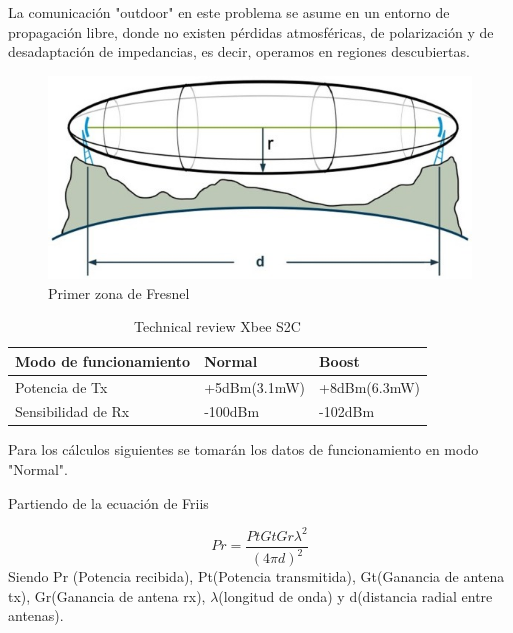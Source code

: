 \documentclass[11pt,oneside,spanish,a4paper]{article}
\begin{document}
La comunicaci\'on "outdoor" en este problema se asume en un entorno de propagaci\'on libre, donde no existen p\'erdidas atmosf\'ericas, de polarizaci\'on y de desadaptaci\'on de impedancias, es decir, operamos en regiones descubiertas. 

\begin{figure}[h]
	\centering\includegraphics[width=0.8\linewidth]{img/Image.jpg}
	\caption{Primer zona de Fresnel}
\end{figure}

\begin{table}[h]
	\centering
	\begin{tabular}{l l l}
		\hline
		\textbf{Modo de funcionamiento} & \textbf{Normal} & \textbf{Boost}\\
		\hline
		Potencia de Tx & +5dBm(3.1mW) & +8dBm(6.3mW) \\
		Sensibilidad de Rx & -100dBm & -102dBm\\
		\hline
	\end{tabular}
	\caption{Technical review Xbee S2C}
\end{table}
Para los c\'alculos siguientes se tomar\'an los datos de funcionamiento en modo "Normal".

Partiendo de la ecuaci\'on de Friis\cite{bilb:Friis}




\begin{equation*}
\label{Ec:Friis}
Pr = \frac{Pt Gt Gr \lambda ^{2}}{(4\pi d)^2}
\end{equation*}
Siendo Pr (Potencia recibida), Pt(Potencia transmitida), Gt(Ganancia de antena tx), Gr(Ganancia de antena rx), $\lambda$(longitud de onda) y d(distancia radial entre antenas).
\end{document}
